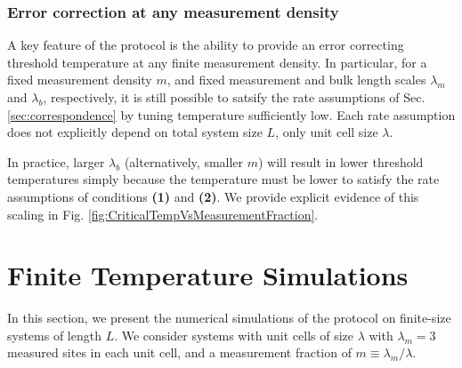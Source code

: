 \documentclass[twocolumn,superscriptaddress,aps,prb,floatfix]{revtex4-1}
\begin{document}
 
 
 \subsubsection{Error correction at any measurement density}
 \label{sec:ecc_any_m}
 
 A key feature of the protocol is the ability to provide an error correcting threshold temperature at any finite measurement density.  In particular, for a fixed measurement density $m$, and fixed measurement and bulk length scales $\lambda_m$ and $\lambda_b$, respectively, it is still possible to satsify the rate assumptions of Sec. \ref{sec:correspondence} by tuning temperature sufficiently low.  Each rate assumption does not explicitly depend on total system size $L$, only unit cell size $\lambda$.
 
 In practice, larger $\lambda_b$ (alternatively, smaller $m$) will result in lower threshold temperatures simply because the temperature must be lower to satisfy the rate assumptions of conditions \textbf{(1)} and \textbf{(2)}.  We provide explicit evidence of this scaling in Fig. \ref{fig:CriticalTempVsMeasurementFraction}.
 

 
\section{Finite Temperature Simulations}
\label{sec:experiments}

In this section, we present the numerical simulations of the protocol on finite-size systems of length $L$. We consider systems with unit cells of size $\lambda$ with $\lambda_m=3$ measured sites in each unit cell, and a measurement fraction of $m\equiv \lambda_m/\lambda$.
\end{document}
